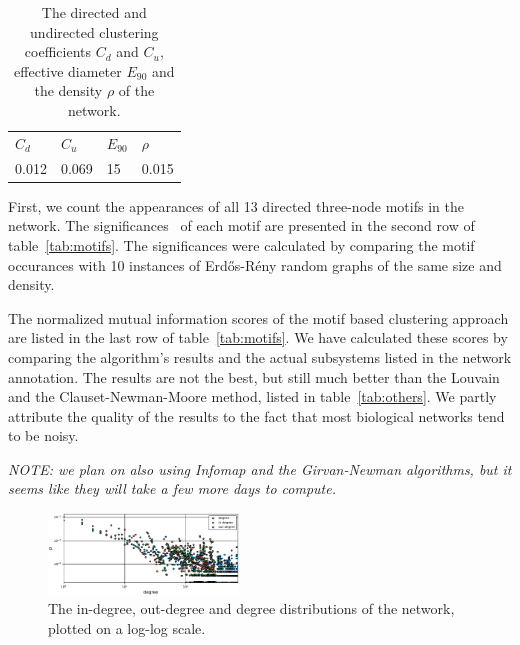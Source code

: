 \begin{table}
  \centering
  \begin{tabular}{l|l|l|l}
    $C_d$ & $C_u$ & $E_{90}$ & $\rho$ \\
    0.012 & 0.069 & 15 & 0.015
  \end{tabular}
  \caption{The directed and undirected clustering coefficients $C_d$ and
    $C_u$, effective diameter $E_{90}$ and the density $\rho$ of the network.}
  \label{tab:metrics}
\end{table}

First, we count the appearances of all 13 directed three-node motifs in the
network. The significances~\cite{milo2002network} of each motif are presented in
the second row of table~\ref{tab:motifs}. The significances were calculated by
comparing the motif occurances with 10 instances of Erdős-Rény random graphs of
the same size and density.

The normalized mutual information scores of the motif based clustering approach
are listed in the last row of table~\ref{tab:motifs}. We have calculated these
scores by comparing the algorithm's results and the actual subsystems listed in
the network annotation. The results are not the best, but still much better than
the Louvain and the Clauset-Newman-Moore method, listed in
table~\ref{tab:others}. We partly attribute the quality of the results to the
fact that most biological networks tend to be noisy.

\emph{NOTE: we plan on also using Infomap and the Girvan-Newman algorithms, but
  it seems like they will take a few more days to compute.}

\begin{figure}
  \includegraphics[width=0.45\textwidth]{../plots/degreesmall}
  \caption{The in-degree, out-degree and degree distributions of the network,
    plotted on a log-log scale.}
  \label{fig:dist}
\end{figure}

